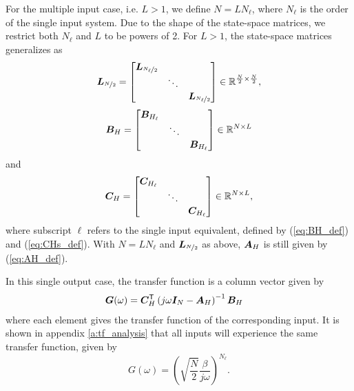 For the multiple input case, i.e. $L>1$, we define $N = L N_\ell$, where $N_\ell$ is the order of the single input system. Due to the shape of the state-space matrices, we restrict both $N_\ell$ and $L$ to be powers of 2. For $L>1$, the state-space matrices generalizes as
\begin{equation}
    \bm{L}_{\nicefrac{N}{2}} =
    \begin{bmatrix}
        \bm{L}_{\nicefrac{N_\ell}{2}} \\
        &  \ddots & \\
        & & \bm{L}_{\nicefrac{N_\ell}{2}}
    \end{bmatrix}
    \in \mathbb{R}^{\frac{N}{2} \times \frac{N}{2}},
\end{equation}
\begin{equation}
    \bm{B}_H =
    \begin{bmatrix}
        \bm{B}_{H_\ell} \\
        &  \ddots & \\
        & & \bm{B}_{H_\ell}
    \end{bmatrix}
    \in \mathbb{R}^{N \times L}
\end{equation}
and
\begin{equation}
    \bm{C}_H =
    \begin{bmatrix}
        \bm{C}_{H_\ell} \\
        &  \ddots & \\
        & & \bm{C}_{H_\ell}
    \end{bmatrix}
    \in \mathbb{R}^{N \times L},
\end{equation}
where subscript $\ell$ refers to the single input equivalent, defined by (\ref{eq:BH_def}) and (\ref{eq:CHs_def}).
With $N=LN_\ell$ and $\bm{L}_{\nicefrac{N}{2}}$ as above, $\bm{A}_H$ is still given by (\ref{eq:AH_def}).

In this single output case, the transfer function is a column vector given by
\begin{align}
    \bm{G}(\omega) & = \bm{C}^\mathsf{T}_H \left( j\omega \bm{I}_{N} - \bm{A}_H \right)^{-1} \bm{B}_H
\end{align}
where each element gives the transfer function of the corresponding input. It is shown in appendix \ref{a:tf_analysis} that all inputs will experience the same transfer function, given by
\begin{equation}
    \label{eq:hci_tf}
    G(\omega) = \left( \sqrt{\frac{N}{2}}\frac{\beta}{j\omega} \right)^{N_\ell}.
\end{equation}













